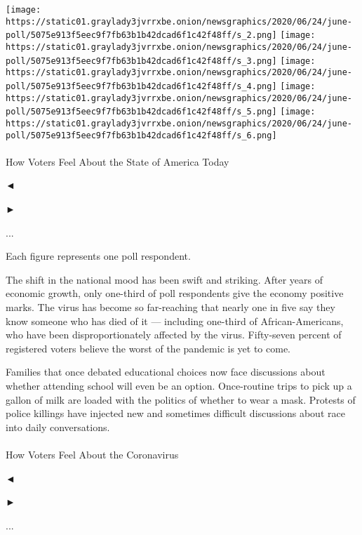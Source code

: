 \texttt{[image: https://static01.graylady3jvrrxbe.onion/newsgraphics/2020/06/24/june-poll/5075e913f5eec9f7fb63b1b42dcad6f1c42f48ff/s\_2.png]}
\texttt{[image: https://static01.graylady3jvrrxbe.onion/newsgraphics/2020/06/24/june-poll/5075e913f5eec9f7fb63b1b42dcad6f1c42f48ff/s\_3.png]}
\texttt{[image: https://static01.graylady3jvrrxbe.onion/newsgraphics/2020/06/24/june-poll/5075e913f5eec9f7fb63b1b42dcad6f1c42f48ff/s\_4.png]}
\texttt{[image: https://static01.graylady3jvrrxbe.onion/newsgraphics/2020/06/24/june-poll/5075e913f5eec9f7fb63b1b42dcad6f1c42f48ff/s\_5.png]}
\texttt{[image: https://static01.graylady3jvrrxbe.onion/newsgraphics/2020/06/24/june-poll/5075e913f5eec9f7fb63b1b42dcad6f1c42f48ff/s\_6.png]}

\paragraph{}

How Voters Feel About the State of America Today

◄

►

...

Each figure represents one poll respondent.

The shift in the national mood has been swift and striking. After years
of economic growth, only one-third of poll respondents give the economy
positive marks. The virus has become so far-reaching that nearly one in
five say they know someone who has died of it --- including one-third of
African-Americans, who have been disproportionately affected by the
virus. Fifty-seven percent of registered voters believe the worst of the
pandemic is yet to come.

Families that once debated educational choices now face discussions
about whether attending school will even be an option. Once-routine
trips to pick up a gallon of milk are loaded with the politics of
whether to wear a mask. Protests of police killings have injected new
and sometimes difficult discussions about race into daily conversations.

\hypertarget{-1}{%
\paragraph{}\label{-1}}

How Voters Feel About the Coronavirus

◄

►

...

